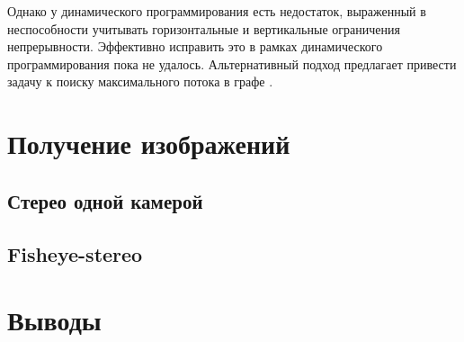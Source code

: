 Однако у динамического программирования есть недостаток, выраженный в неспособности учитывать горизонтальные и вертикальные ограничения непрерывности. Эффективно исправить это в рамках динамического 
программирования пока не удалось. Альтернативный подход предлагает привести задачу к поиску максимального потока в графе \cite{}. 

\section{Получение изображений}

\subsection{Стерео одной камерой }

\subsection{Fisheye-stereo}


\section{Выводы}


\newpage




